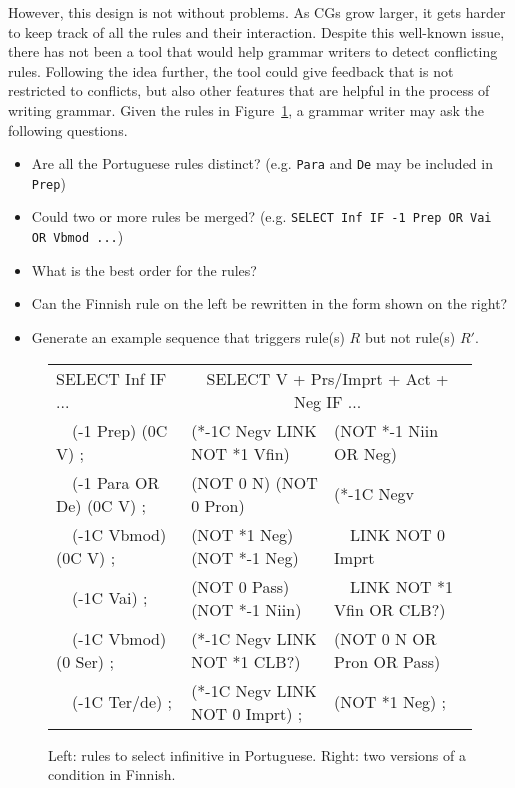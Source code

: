 However, this design is not without problems. As CGs grow larger, it
gets harder to keep track of all the rules and their interaction.
Despite this well-known issue, there has not been a tool that would help 
grammar writers to detect conflicting rules.
Following the idea further, the tool could give feedback that is not 
restricted to conflicts, but also other features that are helpful 
in the process of writing grammar.
Given the rules in Figure~\ref{fig:infrules}, a grammar writer may 
ask the following questions.

\begin{itemize}
\item Are all the Portuguese rules distinct? (e.g. \texttt{Para}
      and \texttt{De} may be included in \texttt{Prep})
\item Could two or more rules be merged?
      (e.g. \texttt{SELECT Inf IF -1 Prep OR Vai OR Vbmod ...})
\item What is the best order for the rules?
\item Can the Finnish rule on the left be rewritten in the form shown on the right?
\item Generate an example sequence that triggers rule(s) $R$ but not rule(s) $R'$. 
\end{itemize}



\begin{figure}[t]
\ttfamily
\centering
\begin{tabular}{l | @{~~~} l  l}
SELECT Inf IF ... & \multicolumn{2}{c}{SELECT V + Prs/Imprt + Act + Neg IF ...} \\
~~(-1 Prep) (0C V) ;       & (*-1C Negv LINK NOT *1 Vfin)  & (NOT *-1 Niin OR Neg)  \\
~~(-1 Para OR De) (0C V) ; & (NOT 0 N) (NOT 0 Pron)        & (*-1C Negv \\
~~(-1C Vbmod) (0C V) ;     & (NOT *1 Neg) (NOT *-1 Neg)    &  ~~LINK NOT 0 Imprt \\
~~(-1C Vai) ;              & (NOT 0 Pass) (NOT *-1 Niin)   &  ~~LINK NOT *1 Vfin OR CLB?) \\
~~(-1C Vbmod) (0 Ser) ;    & (*-1C Negv LINK NOT *1 CLB?)  & (NOT 0 N OR Pron OR Pass) \\
~~(-1C Ter/de) ;           & (*-1C Negv LINK NOT 0 Imprt) ;  & (NOT *1 Neg) ; \\

\end{tabular}

\caption{Left: rules to select infinitive in Portuguese. 
        Right: two versions of a condition in Finnish.}

\label{fig:infrules}
\end{figure}



